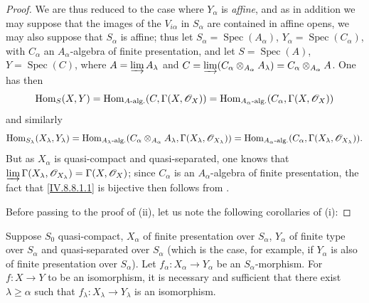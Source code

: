 \begin{proof}
We are thus reduced to the case where $Y_\alpha$ is \emph{affine}, and as in addition we may suppose that the images of the $V_{i\alpha}$ in $S_\alpha$ are contained in affine opens, we may also suppose that $S_\alpha$ is affine; thus let $S_\alpha=\operatorname{Spec}(A_\alpha)$, $Y_\alpha=\operatorname{Spec}(C_\alpha)$, with $C_\alpha$ an $A_\alpha$-algebra of finite presentation, and let $S=\operatorname{Spec}(A)$, $Y=\operatorname{Spec}(C)$, where $A=\varinjlim A_\lambda$ and $C=\varinjlim(C_\alpha\otimes_{A_\alpha}A_\lambda)=C_\alpha\otimes_{A_\alpha}A$.
One has then
\[
  \operatorname{Hom}_S(X,Y)=\operatorname{Hom}_{A\text{-alg.}}(C,\Gamma(X,\mathscr{O}_X))=\operatorname{Hom}_{A_\alpha\text{-alg.}}(C_\alpha,\Gamma(X,\mathscr{O}_X))
\]
 and similarly
\[
  \operatorname{Hom}_{S_\lambda}(X_\lambda,Y_\lambda)=\operatorname{Hom}_{A_\lambda\text{-alg.}}(C_\alpha\otimes_{A_\alpha}A_\lambda,\Gamma(X_\lambda,\mathscr{O}_{X_\lambda}))=\operatorname{Hom}_{A_\alpha\text{-alg.}}(C_\alpha,\Gamma(X_\lambda,\mathscr{O}_{X_\lambda})).
\]
But as $X_\alpha$ is quasi-compact and quasi-separated, one knows  that $\varinjlim\Gamma(X_\lambda,\mathscr{O}_{X_\lambda})=\Gamma(X,\mathscr{O}_X)$; since $C_\alpha$ is an $A_\alpha$-algebra of finite presentation, the fact that \eqref{IV.8.8.1.1} is bijective then follows from .

Before passing to the proof of (ii), let us note the following corollaries of (i):
\end{proof}

\begin{corollary}[8.8.2.4]
\label{IV.8.8.2.4}
Suppose $S_0$ quasi-compact, $X_\alpha$ of finite presentation over $S_\alpha$, $Y_\alpha$ of finite type over $S_\alpha$ and quasi-separated over $S_\alpha$ (which is the case, for example, if $Y_\alpha$ is also
of finite presentation over $S_\alpha$).
Let $f_\alpha:X_\alpha\to Y_\alpha$ be an $S_\alpha$-morphism.
For $f:X\to Y$ to be an isomorphism, it is necessary and sufficient that there exist $\lambda\geqslant\alpha$ such that $f_\lambda:X_\lambda\to Y_\lambda$ is an isomorphism.
\end{corollary}

